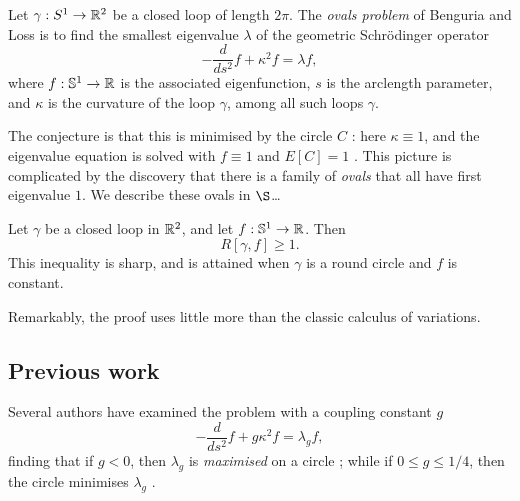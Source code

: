 Let $\gamma:S^1\to {\mathbb R}^2$ be a closed loop of length $2\pi$. The \emph{ovals problem} of Benguria and Loss  is to find the smallest eigenvalue $\lambda$ of the geometric Schr\"odinger operator
\begin{equation} -\frac{d}{ds^2}f + \kappa^2 f=\lambda f, \label{eigenvalue equation} \end{equation}
where $f:\operatorname{\mathbb{S}^1}\to{\mathbb R}$ is the associated eigenfunction, $s$ is the arclength parameter, and $\kappa$ is the curvature of the loop $\gamma$, among all such loops $\gamma$.



The conjecture  is that this is minimised by the circle $C$ :  here $\kappa\equiv1$, and the eigenvalue equation is solved with $f\equiv 1$ and $E[C]=1$ \cite{benguria2004connection}.   This  picture is complicated by the discovery that there is a family of \emph{ovals} that all have first eigenvalue $1$.   We describe these ovals in $\S$\dots


\begin{thm} \label{main} Let $\gamma$ be a closed loop in ${\mathbb R}^2$, and let $f:\operatorname{\mathbb{S}^1}\to {\mathbb R}$.  Then 
$$R[\gamma,f]\ge 1.$$
This inequality is sharp, and is attained when $\gamma$ is a round circle and $f$ is constant.
\end{thm}

Remarkably, the proof uses little more than the classic calculus of variations.

\subsection{Previous work}  Several authors have examined the problem with a coupling constant $g$
\begin{equation} -\frac{d}{ds^2}f + g\kappa^2 f=\lambda_g f, \label{eigenvalue equation}\end{equation}
finding that if $g<0$, then $\lambda_g$ is  \emph{maximised} on a circle \cite{duclos1995curvature}; while if $0\le g\le 1/4$, then the circle minimises $\lambda_g$ \cite{exner1999optimal}.  

